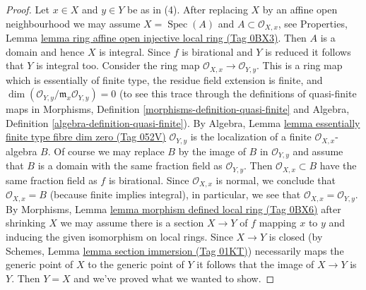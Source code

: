 \documentclass{amsart}
\theoremstyle{plain}
\theoremstyle{definition}
\theoremstyle{remark}
\numberwithin{equation}{subsection}
\def\Spec{\mathop{\mathrm{Spec}}}
\begin{document}
\begin{proof}
\medskip\noindent
Let $x \in X$ and $y \in Y$ be as in (4). After replacing $X$
by an affine open neighbourhood we may assume $X = \Spec(A)$
and $A \subset \mathcal{O}_{X, x}$, see
Properties, Lemma \href{https://stacks.math.columbia.edu/tag/0BX3}{lemma ring affine open injective local ring (Tag 0BX3)}.
Then $A$ is a domain and hence $X$ is integral.
Since $f$ is birational and $Y$ is reduced
it follows that $Y$ is integral too. Consider the ring map
$\mathcal{O}_{X, x} \to \mathcal{O}_{Y, y}$. This is a ring map
which is essentially of finite type, the residue field extension
is finite, and $\dim(\mathcal{O}_{Y, y}/\mathfrak m_x\mathcal{O}_{Y, y}) = 0$
(to see this trace through the definitions of quasi-finite
maps in
Morphisms, Definition \ref{morphisms-definition-quasi-finite} and
Algebra, Definition \ref{algebra-definition-quasi-finite}). By
Algebra, Lemma \href{https://stacks.math.columbia.edu/tag/052V}{lemma essentially finite type fibre dim zero (Tag 052V)}
$\mathcal{O}_{Y, y}$ is the localization of a finite
$\mathcal{O}_{X, x}$-algebra $B$. Of course we may replace
$B$ by the image of $B$ in $\mathcal{O}_{Y, y}$ and assume
that $B$ is a domain with the same fraction field as $\mathcal{O}_{Y, y}$.
Then $\mathcal{O}_{X, x} \subset B$
have the same fraction field as $f$ is birational. Since
$\mathcal{O}_{X, x}$ is normal, we conclude that
$\mathcal{O}_{X, x} = B$ (because finite implies integral),
in particular, we see that $\mathcal{O}_{X, x} = \mathcal{O}_{Y, y}$. By
Morphisms, Lemma \href{https://stacks.math.columbia.edu/tag/0BX6}{lemma morphism defined local ring (Tag 0BX6)}
after shrinking $X$ we may assume there is a section
$X \to Y$ of $f$ mapping $x$ to $y$ and inducing the given
isomorphism on local rings. Since $X \to Y$ is closed
(by Schemes, Lemma \href{https://stacks.math.columbia.edu/tag/01KT}{lemma section immersion (Tag 01KT)})
necessarily maps the generic point of $X$ to the generic point of $Y$
it follows that the image of $X \to Y$ is $Y$.
Then $Y = X$ and we've proved what we wanted to show.
\end{proof}
\end{document}
